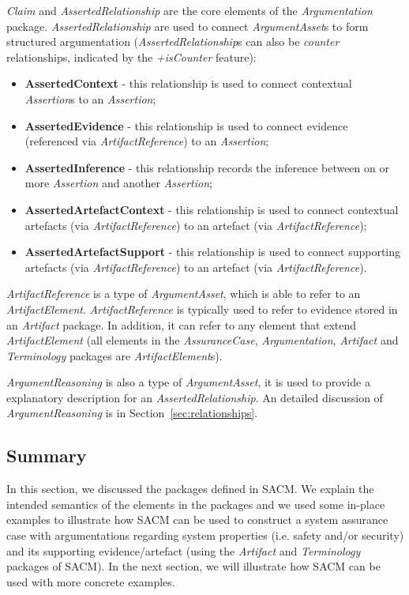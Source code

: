 \textit{Claim} and \textit{AssertedRelationship} are the core elements of the \textit{Argumentation} package. \textit{AssertedRelationship} are used to connect \textit{ArgumentAsset}s to form structured argumentation (\textit{AssertedRelationship}s can also be \textit{counter} relationships, indicated by the \textit{+isCounter} feature):

\begin{itemize}
	\item \textbf{AssertedContext} - this relationship is used to connect contextual \textit{Assertion}s to an \textit{Assertion};
	\item \textbf{AssertedEvidence} - this relationship is used to connect evidence (referenced via \textit{ArtifactReference}) to an \textit{Assertion};
	\item \textbf{AssertedInference} - this relationship records the inference between on or more \textit{Assertion} and another \textit{Assertion};
	\item \textbf{AssertedArtefactContext} - this relationship is used to connect contextual artefacts (via \textit{ArtifactReference}) to an artefact (via \textit{ArtifactReference});
	\item \textbf{AssertedArtefactSupport} - this relationship is used to connect supporting artefacts (via \textit{ArtifactReference}) to an artefact (via \textit{ArtifactReference}).
\end{itemize}

\textit{ArtifactReference} is a type of \textit{ArgumentAsset}, which is able to refer to an \textit{ArtifactElement}. \textit{ArtifactReference} is typically used to refer to evidence stored in an \textit{Artifact} package. In addition, it can refer to any element that extend \textit{ArtifactElement} (all elements in the \textit{AssuranceCase}, \textit{Argumentation}, \textit{Artifact} and \textit{Terminology} packages are \textit{ArtifactElement}s).

\textit{ArgumentReasoning} is also a type of \textit{ArgumentAsset}, it is used to provide a explanatory description for an \textit{AssertedRelationship}. An detailed discussion of \textit{ArgumentReasoning} is in Section~\ref{sec:relationships}.

\subsection{Summary}
In this section, we discussed the packages defined in SACM. We explain the intended semantics of the elements in the packages and we used some in-place examples to illustrate how SACM can be used to construct a system assurance case with argumentations regarding system properties (i.e. safety and/or security) and its supporting evidence/artefact (using the \textit{Artifact} and \textit{Terminology} packages of SACM). In the next section, we will illustrate how SACM can be used with more concrete examples.

